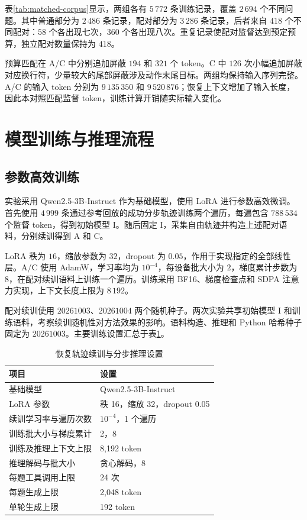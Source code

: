 表\ref{tab:matched-corpus}显示，两组各有 $5\,772$ 条训练记录，覆盖 $2\,694$ 个不同问题。其中普通部分为 $2\,486$ 条记录，配对部分为 $3\,286$ 条记录，后者来自 $418$ 个不同配对：$58$ 个各出现七次，$360$ 个各出现八次。重复记录使配对监督达到预定预算，独立配对数量保持为 $418$。

预算匹配在 A/C 中分别追加屏蔽 $194$ 和 $321$ 个 token。C 中 $126$ 次小幅追加屏蔽对应换行符，少量较大的尾部屏蔽涉及动作末尾目标。两组均保持输入序列完整。A/C 的输入 token 分别为 $9\,135\,350$ 和 $9\,520\,876$；恢复上下文增加了输入长度，因此本对照匹配监督 token，训练计算开销随实际输入变化。

\section{模型训练与推理流程}

\subsection{参数高效训练}

实验采用 Qwen2.5-3B-Instruct\cite{qwen2024qwen25} 作为基础模型，使用 LoRA\cite{hu2022lora} 进行参数高效微调。首先使用 $4\,999$ 条通过参考回放的成功分步轨迹训练两个遍历，每遍包含 $788\,534$ 个监督 token，得到初始模型 I。随后固定 I，采集自由轨迹并构造上述配对语料，分别续训得到 A 和 C。

LoRA 秩为 $16$，缩放参数为 $32$，dropout 为 $0.05$，作用于实现指定的全部线性层。A/C 使用 AdamW，学习率均为 $10^{-4}$，每设备批大小为 $2$，梯度累计步数为 $8$，在配对续训语料上训练一个遍历。训练采用 BF16、梯度检查点和 SDPA 注意力实现，上下文长度上限为 $8\,192$。

配对续训使用 $20261003$、$20261004$ 两个随机种子。两次实验共享初始模型 I 和训练语料，考察续训随机性对方法效果的影响。语料构造、推理和 Python 哈希种子固定为 $20261003$。主要训练设置汇总于表\ref{tab:method-settings}。

\begin{table}[htbp]
\centering
\caption{恢复轨迹续训与分步推理设置}
\label{tab:method-settings}
\begin{tabular}{ll}
\toprule
项目 & 设置\\
\midrule
基础模型 & Qwen2.5-3B-Instruct\\
LoRA 参数 & 秩 16，缩放 32，dropout 0.05\\
续训学习率与遍历次数 & $10^{-4}$，1 个遍历\\
训练批大小与梯度累计 & 2，8\\
训练及推理上下文上限 & 8,192 token\\
推理解码与批大小 & 贪心解码，8\\
每题工具调用上限 & 24 次\\
每题生成上限 & 2,048 token\\
单轮生成上限 & 192 token\\
\bottomrule
\end{tabular}
\end{table}

